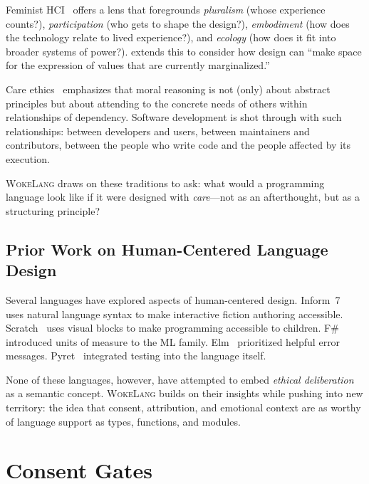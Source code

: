 \documentclass[11pt,a4paper]{article}
\newcommand{\WokeLang}{\textsc{WokeLang}}
\begin{document}
Feminist HCI~\citep{bardzell2010feminist} offers a lens that
foregrounds \emph{pluralism} (whose experience counts?),
\emph{participation} (who gets to shape the design?),
\emph{embodiment} (how does the technology relate to lived
experience?), and \emph{ecology} (how does it fit into broader systems
of power?).  \citet{light2011hci} extends this to consider how design
can ``make space for the expression of values that are currently
marginalized.''

Care ethics~\citep{gilligan1982different,held2006ethics} emphasizes
that moral reasoning is not (only) about abstract principles but about
attending to the concrete needs of others within relationships of
dependency.  Software development is shot through with such
relationships: between developers and users, between maintainers and
contributors, between the people who write code and the people
affected by its execution.

\WokeLang{} draws on these traditions to ask: what would a
programming language look like if it were designed with
\emph{care}---not as an afterthought, but as a structuring principle?

\subsection{Prior Work on Human-Centered Language Design}

Several languages have explored aspects of human-centered design.
Inform~7~\citep{nelson2006natural} uses natural language syntax to
make interactive fiction authoring accessible.  Scratch~\citep{resnick2009scratch}
uses visual blocks to make programming accessible to children.
F\#~\citep{syme2003units} introduced units of measure to the ML
family.  Elm~\citep{czaplicki2012elm} prioritized helpful error
messages.  Pyret~\citep{krishnamurthi2019pyret} integrated testing
into the language itself.

None of these languages, however, have attempted to embed
\emph{ethical deliberation} as a semantic concept.  \WokeLang{} builds
on their insights while pushing into new territory: the idea that
consent, attribution, and emotional context are as worthy of language
support as types, functions, and modules.

\section{Consent Gates}
\label{sec:consent}
\end{document}
